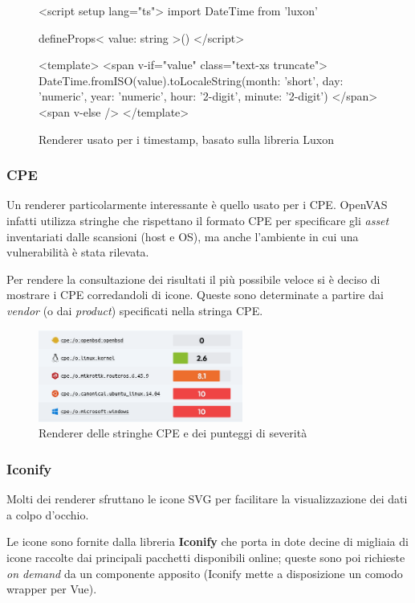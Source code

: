 \begin{figure}
\centering
\begin{vuesfc}
<script setup lang="ts">
import { DateTime } from 'luxon'
  
defineProps<{ value: string }>()
</script>
  
<template>
  <span v-if="value" class="text-xs truncate">
    {{ DateTime.fromISO(value).toLocaleString({month: 'short', day: 'numeric', year: 'numeric', hour: '2-digit', minute: '2-digit'}) }}
  </span>
  <span v-else />
</template>
\end{vuesfc}
\caption{Renderer usato per i timestamp, basato sulla libreria Luxon}
\end{figure}

\subsubsection{CPE}
Un renderer particolarmente interessante è quello usato per i CPE. OpenVAS infatti utilizza stringhe che rispettano il formato CPE per specificare gli \emph{asset} inventariati dalle scansioni (host e OS), ma anche l'ambiente in cui una vulnerabilità è stata rilevata.

Per rendere la consultazione dei risultati il più possibile veloce si è deciso di mostrare i CPE corredandoli di icone. Queste sono determinate a partire dai \emph{vendor} (o dai \emph{product}) specificati nella stringa CPE.

\begin{figure}
\centering
\includegraphics[width=0.6\textwidth]{img/cpe.png}
\caption{Renderer delle stringhe CPE e dei punteggi di severità}
\end{figure}

\subsubsection{Iconify}
Molti dei renderer sfruttano le icone SVG per facilitare la visualizzazione dei dati a colpo d'occhio.

Le icone sono fornite dalla libreria \textbf{Iconify} che porta in dote decine di migliaia di icone raccolte dai principali pacchetti disponibili online; queste sono poi richieste \emph{on demand} da un componente apposito (Iconify mette a disposizione un comodo wrapper per Vue).

